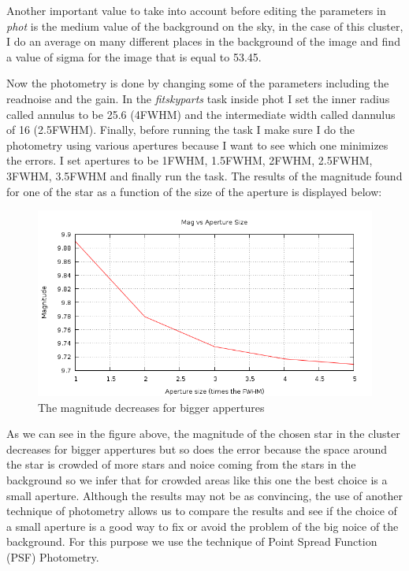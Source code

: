 Another important value to take into account before editing the parameters in \textit{phot} is the medium value of the background on the sky, in the case of this cluster, I do an average on many different places in the background of the image and find a value of sigma for the image that is equal to 53.45.

Now the photometry is done by changing some of the parameters including the readnoise and the gain. In the \textit{fitskyparts} task inside phot I set the inner radius called annulus to be 25.6 (4FWHM) and the intermediate width called dannulus of 16 (2.5FWHM). Finally, before running the task I make sure I do the photometry using various apertures because I want to see which one minimizes the errors. I set apertures to be 1FWHM, 1.5FWHM, 2FWHM, 2.5FWHM, 3FWHM, 3.5FWHM and finally run the task. The results of the magnitude found for one of the star as a function of the size of the aperture is displayed below:

\begin{figure}[H]
\centering
\includegraphics[width=12cm]{images/mag_vs_ap_size.png}
\caption[Photometry results of Magnitudes vs Size of apertures]{The magnitude decreases for bigger appertures}
\end{figure}

As we can see in the figure above, the magnitude of the chosen star in the cluster decreases for bigger appertures but so does the error because the space around the star is crowded of more stars and noice coming from the stars in the background so we infer that for crowded areas like this one the best choice is a small aperture. Although the results may not be as convincing, the use of another technique of photometry allows us to compare the results and see if the choice of a small aperture is a good way to fix or avoid the problem of the big noice of the background. For this purpose we use the technique of Point Spread Function (PSF) Photometry.

